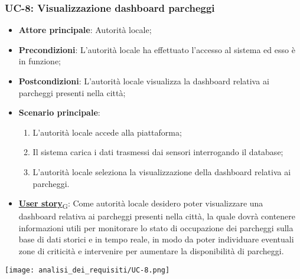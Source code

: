 \subsubsection{UC-8: Visualizzazione dashboard parcheggi}
\begin{itemize}
	\item \textbf{Attore principale}: Autorità locale;
	\item \textbf{Precondizioni}: L'autorità locale ha effettuato l'accesso al sistema ed esso è in funzione;
	\item \textbf{Postcondizioni}: L'autorità locale visualizza la dashboard relativa
	      ai parcheggi presenti nella città;
	\item \textbf{Scenario principale}:
	      \begin{enumerate}
		      \item L'autorità locale accede alla piattaforma;
		      \item Il sistema carica i dati trasmessi dai sensori interrogando il database;
		      \item L'autorità locale seleziona la visualizzazione della dashboard relativa ai parcheggi.
	      \end{enumerate}
	\item \href{https://7last.github.io/docs/rtb/documentazione-interna/glossario\#user-story}{\textbf{User story}\textsubscript{G}}:
	      Come autorità locale desidero poter visualizzare una dashboard relativa ai parcheggi presenti nella città, la quale
	      dovrà contenere informazioni utili per monitorare lo stato di occupazione dei parcheggi sulla base di dati storici e in tempo reale,
	      in modo da poter individuare eventuali zone di criticità e intervenire per aumentare la disponibilità di parcheggi.
\end{itemize}
\begin{center}
	\texttt{[image: analisi\_dei\_requisiti/UC-8.png]}
\end{center}

